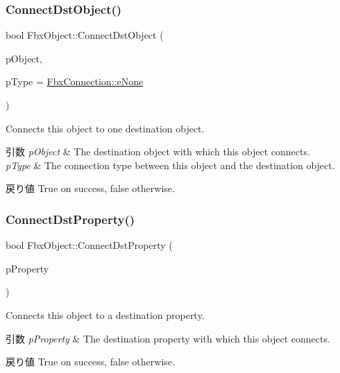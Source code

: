 \subsubsection{\texorpdfstring{Connect\+Dst\+Object()}{ConnectDstObject()}}
{\footnotesize\ttfamily bool Fbx\+Object\+::\+Connect\+Dst\+Object (\begin{DoxyParamCaption}\item[{\hyperlink{class_fbx_object}{Fbx\+Object} $\ast$}]{p\+Object,  }\item[{\hyperlink{class_fbx_connection_a3df448a5db356652ab99fd2be2553749}{Fbx\+Connection\+::\+E\+Type}}]{p\+Type = {\ttfamily \hyperlink{class_fbx_connection_a3df448a5db356652ab99fd2be2553749a47aa04870c3c0769263e3972e67e9ebe}{Fbx\+Connection\+::e\+None}} }\end{DoxyParamCaption})}

Connects this object to one destination object. 
\begin{DoxyParams}{引数}
{\em p\+Object} & The destination object with which this object connects. \\
\hline
{\em p\+Type} & The connection type between this object and the destination object. \\
\hline
\end{DoxyParams}
\begin{DoxyReturn}{戻り値}
{\ttfamily True} on success, {\ttfamily false} otherwise. 
\end{DoxyReturn}
\mbox{\label{class_fbx_object_a6bd087870ae3d3dc82c89105387e7baa}} 
\subsubsection{\texorpdfstring{Connect\+Dst\+Property()}{ConnectDstProperty()}}
{\footnotesize\ttfamily bool Fbx\+Object\+::\+Connect\+Dst\+Property (\begin{DoxyParamCaption}\item[{const \hyperlink{class_fbx_property}{Fbx\+Property} \&}]{p\+Property }\end{DoxyParamCaption})}

Connects this object to a destination property. 
\begin{DoxyParams}{引数}
{\em p\+Property} & The destination property with which this object connects. \\
\hline
\end{DoxyParams}
\begin{DoxyReturn}{戻り値}
{\ttfamily True} on success, {\ttfamily false} otherwise. 
\end{DoxyReturn}
\mbox{\label{class_fbx_object_ab7a400f3829d1f0da57d3d78c8168dd0}} 
